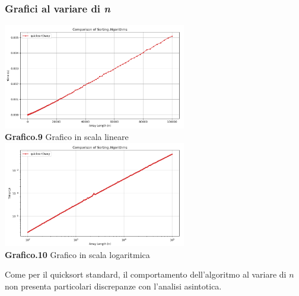\documentclass{article}
\begin{document}
        \subsubsection{Grafici al variare di \textit{n}}
            \begin{center}
                \includegraphics[width=0.6\textwidth]{Quicksort3way.png} \\
                \textbf{Grafico.9} Grafico in scala lineare\\
                \vspace{0.5cm}
                \includegraphics[width=0.6\textwidth]{Quicksort3way_Log.png} \\
                \textbf{Grafico.10} Grafico in scala logaritmica\\
            \end{center}
            Come per il quicksort standard, il comportamento dell'algoritmo al variare di $n$ non presenta particolari discrepanze con l'analisi asintotica.
\end{document}
